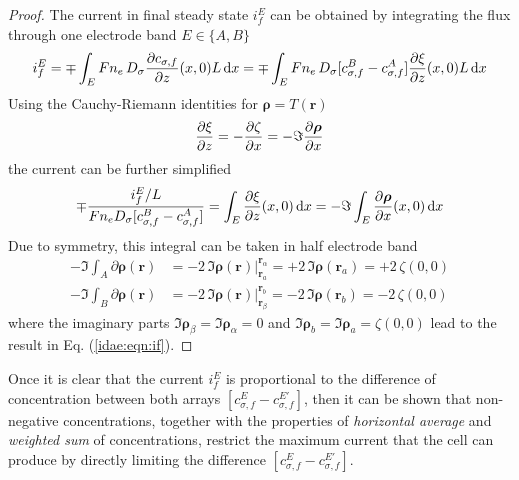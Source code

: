\begin{proof}
	The current in final steady state $i_{f}^{E}$ can be obtained
	by integrating the flux through one electrode band $E \in \{A,B\}$
	\begin{equation}
		i_{f}^{E}
		= \mp \int_{E} F n_{e}\, D_{\sigma} \frac{\partial c_{\sigma,f}}{\partial z}(x,0) L \,\mathrm{d}x
		= \mp \int_{E} F n_{e}\, D_{\sigma} [c_{\sigma,f}^{B} - c_{\sigma,f}^{A}] \frac{\partial \xi}{\partial z}(x,0) L \,\mathrm{d}x
	\end{equation}
	Using the Cauchy-Riemann identities \cite[Theorem 3.2]{Olver:2017:} for $\bm{\rho} = T(\bm{r})$
	\begin{equation}
		\frac{\partial \xi}{\partial z} = -\frac{\partial \zeta}{\partial x} = -\Im \frac{\partial \bm{\rho}}{\partial x}
	\end{equation}
	the current can be further simplified
	\begin{equation}
		\label{idae:eqn:int_dxi7dz_dx}
		\mp \frac{
			i_{f}^{E}/L
		}{
			F n_{e} D_{\sigma} [c_{\sigma,f}^{B} - c_{\sigma,f}^{A}]
		}
		= \int_{E} \frac{\partial \xi}{\partial z}(x,0) \,\mathrm{d}x
		= -\Im \int_{E} \frac{\partial \bm{\rho}}{\partial x}(x,0) \,\mathrm{d}x
	\end{equation}
	Due to symmetry, this integral can be taken in half electrode band
	\begin{subequations}
		\begin{align}
			-\Im \int_{A} \partial\bm{\rho}(\bm{r})
			&= -2\,\Im\bm{\rho}(\bm{r})\Big|_{\bm{r}_{a}}^{\bm{r}_{\alpha}}
			= +2\, \Im \bm{\rho}(\bm{r}_{a})
			= +2\, \zeta(0,0)
			\\
			-\Im \int_{B} \partial\bm{\rho}(\bm{r})
			&= -2\,\Im\bm{\rho}(\bm{r})\Big|_{\bm{r}_{\beta}}^{\bm{r}_{b}}
			= -2\, \Im \bm{\rho}(\bm{r}_{b})
			= -2\, \zeta(0,0)
		\end{align}
	\end{subequations}
	where the imaginary parts $\Im\bm{\rho}_{\beta} = \Im\bm{\rho}_{\alpha} = 0$
	and $\Im\bm{\rho}_{b} = \Im\bm{\rho}_{a} = \zeta(0,0)$
	lead to the result in Eq. (\ref{idae:eqn:if}).
\end{proof}

Once it is clear that the current $i_{f}^{E}$ is proportional to
the difference of concentration between both arrays $[c_{\sigma,f}^{E} - c_{\sigma,f}^{E'}]$,
then it can be shown that non-negative concentrations,
together with the properties of \emph{horizontal average} and \emph{weighted sum} of concentrations,
restrict the maximum current that the cell can produce by directly limiting the difference $[c_{\sigma,f}^{E} - c_{\sigma,f}^{E'}]$.

